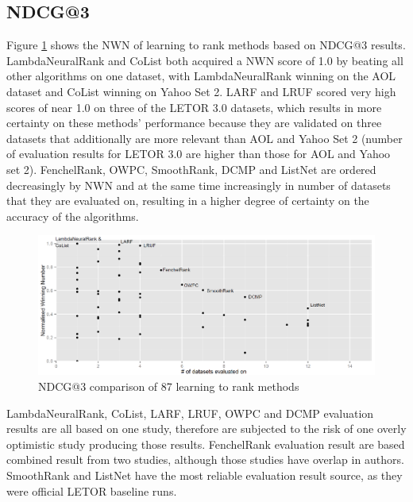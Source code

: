 \documentclass{llncs}
\begin{document}
\subsection{NDCG@3}
Figure \ref{fig:normalized_winning_number_ndcg3} shows the NWN of learning to rank methods based on NDCG@3 results. LambdaNeuralRank and CoList both acquired a NWN score of 1.0 by beating all other algorithms on one dataset, with LambdaNeuralRank winning on the AOL dataset and CoList winning on Yahoo Set 2. LARF and LRUF scored very high scores of near 1.0 on three of the LETOR 3.0 datasets, which results in more certainty on these methods' performance because they are validated on three datasets that additionally are more relevant than AOL and Yahoo Set 2 (number of evaluation results for LETOR 3.0 are higher than those for AOL and Yahoo set 2). FenchelRank, OWPC, SmoothRank, DCMP and ListNet are ordered decreasingly by NWN and at the same time increasingly in number of datasets that they are evaluated on, resulting in a higher degree of certainty on the accuracy of the algorithms.
\begin{figure}[h]
\centering
\includegraphics[scale=0.19]{gfx/ndcg3_winnum}
\caption{NDCG@3 comparison of 87 learning to rank methods}
\label{fig:normalized_winning_number_ndcg3}
\end{figure}
\vspace{-0.08in}
LambdaNeuralRank, CoList, LARF, LRUF, OWPC and DCMP evaluation results are all based on one study, therefore are subjected to the risk of one overly optimistic study producing those results. FenchelRank evaluation result are based combined result from two studies, although those studies have overlap in authors. SmoothRank and ListNet have the most reliable evaluation result source, as they were official LETOR baseline runs.  
\end{document}
